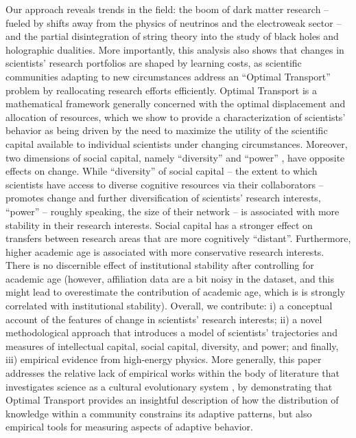 \documentclass{article}
\begin{document}
Our approach reveals trends in the field: the boom of dark matter research -- fueled by shifts away from the physics of neutrinos and the electroweak sector -- and the partial disintegration of string theory into the study of black holes and holographic dualities. More importantly, this analysis also shows that changes in scientists' research portfolios are shaped by learning costs, as scientific communities adapting to new circumstances address an ``Optimal Transport'' problem by reallocating research efforts efficiently. Optimal Transport is a mathematical framework generally concerned with the optimal displacement and allocation of resources, which we show to provide a characterization of scientists' behavior as being driven by the need to maximize the utility of the scientific capital available to individual scientists under changing circumstances. Moreover, two dimensions of social capital, namely ``diversity'' and ``power'' \citep{Abbasi2014}, have opposite effects on change. While ``diversity'' of social capital  -- the extent to which scientists have access to diverse cognitive resources via their collaborators -- promotes change and further diversification of scientists' research interests, ``power'' -- roughly speaking, the size of their network -- is associated with more stability in their research interests. Social capital has a stronger effect on transfers between research areas that are more cognitively ``distant''. Furthermore, higher academic age is associated with more conservative research interests. There is no discernible effect of institutional stability after controlling for academic age (however, affiliation data are a bit noisy in the dataset, and this might lead to overestimate the contribution of academic age, which is is strongly correlated with institutional stability). %
Overall, we contribute: i) a conceptual account of the features of change in scientists' research interests; ii) a novel methodological approach that introduces a model of scientists' trajectories and measures of intellectual capital, social capital, diversity, and power; and finally, iii) empirical evidence from high-energy physics. More generally, this paper addresses the relative lack of empirical works within the body of literature that investigates science as a cultural evolutionary system \citep{Wu2023}, by demonstrating that Optimal Transport provides an insightful description of how the distribution of knowledge within a community constrains its adaptive patterns, but also empirical tools for measuring aspects of adaptive behavior.
\end{document}
